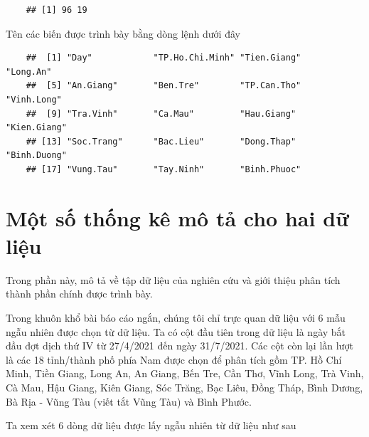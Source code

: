 \documentclass[../thesis.tex]{subfiles}
\begin{document}
\begin{verbatim}
	## [1] 96 19
\end{verbatim}

Tên các biến được trình bày bằng dòng lệnh dưới đây

\begin{Shaded}
	\begin{Highlighting}[]
\SpecialCharTok{\%\textgreater{}\%} \NormalTok{()}
	\end{Highlighting}
\end{Shaded}

\begin{verbatim}
	##  [1] "Day"            "TP.Ho.Chi.Minh" "Tien.Giang"     "Long.An"       
	##  [5] "An.Giang"       "Ben.Tre"        "TP.Can.Tho"     "Vinh.Long"     
	##  [9] "Tra.Vinh"       "Ca.Mau"         "Hau.Giang"      "Kien.Giang"    
	## [13] "Soc.Trang"      "Bac.Lieu"       "Dong.Thap"      "Binh.Duong"    
	## [17] "Vung.Tau"       "Tay.Ninh"       "Binh.Phuoc"
\end{verbatim}

\newpage
\section{Một số thống kê mô tả cho hai dữ liệu}

Trong phần này, mô tả về tập dữ liệu của nghiên cứu và giới thiệu phân tích thành phần chính được trình bày.

Trong khuôn khổ bài báo cáo ngắn, chúng tôi chỉ trực quan dữ liệu với 6 mẫu ngẫu nhiên được chọn từ dữ liệu. Ta có cột đầu tiên trong dữ liệu là ngày bắt đầu đợt dịch thứ IV từ 27/4/2021 đến ngày 31/7/2021. Các cột còn lại lần lượt là các 18 tỉnh/thành phố phía Nam được chọn để phân tích gồm TP. Hồ Chí Minh, Tiền Giang, Long An, An Giang, Bến Tre, Cần Thơ, Vĩnh Long, Trà Vinh, Cà Mau, Hậu Giang, Kiên Giang, Sóc Trăng, Bạc Liêu, Đồng Tháp, Bình Dương, Bà Rịa - Vũng Tàu (viết tắt Vũng Tàu) và Bình Phước.

Ta xem xét 6 dòng dữ liệu được lấy ngẫu nhiên từ dữ liệu như sau
\begin{Shaded}
	\begin{Highlighting}[]
\SpecialCharTok{\%\textgreater{}\%} \NormalTok{)}
	\end{Highlighting}
\end{Shaded}
\end{document}
